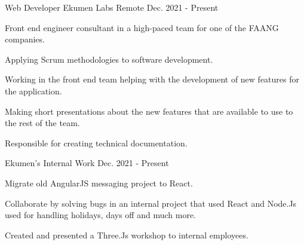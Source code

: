 

\begin{cventries}

  \cventry
    {Web Developer} %
    {Ekumen Labs} %
    {Remote} %
    {Dec. 2021 - Present} %
    {
      \begin{cvitems} %
        \item {Front end engineer consultant in a high-paced team for one of the FAANG companies.}
        \item {Applying Scrum methodologies to software development.}
        \item {Working in the front end team helping with the development of new features for the application.}
        \item {Making short presentations about the new features that are available to use to the rest of the team.}
        \item {Responsible for creating technical documentation.}
      \end{cvitems}
    }
    
\cventry
{Ekumen's Internal Work} %
{} %
{}  %
{Dec. 2021 - Present} %
{
  \begin{cvitems} %
      \item{Migrate old AngularJS messaging project to React.}
    \item{Collaborate by solving bugs in an internal project that used React and Node.Js used for handling holidays, days off and much more.}
    \item{Created and presented a Three.Js workshop to internal employees.}
  \end{cvitems}
}


\end{cventries}
